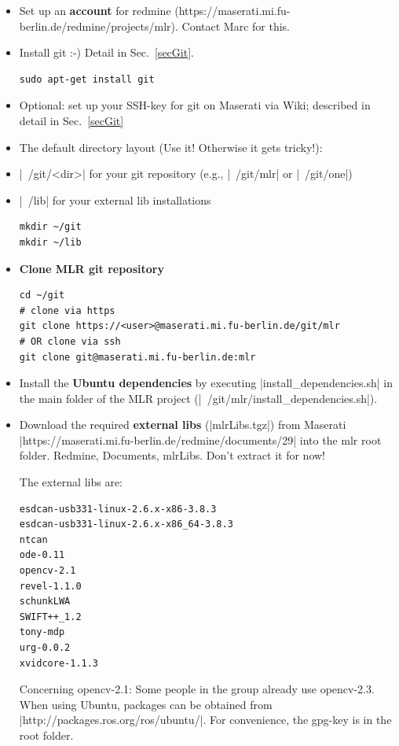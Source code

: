 \begin{itemize}
\item Set up an \textbf{account} for redmine
   (https://maserati.mi.fu-berlin.de/redmine/projects/mlr).
   Contact Marc for this.

\item Install git :-) Detail in Sec.~\ref{secGit}.
\begin{code}
\begin{verbatim}
sudo apt-get install git
\end{verbatim}
\end{code}

\item Optional: set up your SSH-key for git on Maserati via Wiki; described in
detail in Sec.~\ref{secGit}

\item The default directory layout (Use it! Otherwise it gets tricky!):
\bi
\item |~/git/<dir>| for your git repository (e.g., |~/git/mlr| or
|~/git/one|)
\item |~/lib| for your external lib installations
\ei
\begin{code}
\begin{verbatim}
mkdir ~/git
mkdir ~/lib
\end{verbatim}
\end{code}

\item \textbf{Clone MLR git repository}
\begin{code}
\begin{verbatim}
cd ~/git
# clone via https
git clone https://<user>@maserati.mi.fu-berlin.de/git/mlr
# OR clone via ssh
git clone git@maserati.mi.fu-berlin.de:mlr
\end{verbatim}
\end{code}

\item Install the \textbf{Ubuntu dependencies} by executing |install_dependencies.sh| in the main folder of the MLR project (|~/git/mlr/install_dependencies.sh|).

\item Download the required \textbf{external libs} (|mlrLibs.tgz|) from Maserati |https://maserati.mi.fu-berlin.de/redmine/documents/29| into the mlr root folder.
Redmine, Documents, mlrLibs.
Don't extract it for now!

The external libs are:
\begin{code}
\begin{verbatim}
esdcan-usb331-linux-2.6.x-x86-3.8.3
esdcan-usb331-linux-2.6.x-x86_64-3.8.3
ntcan
ode-0.11
opencv-2.1
revel-1.1.0
schunkLWA
SWIFT++_1.2
tony-mdp
urg-0.0.2
xvidcore-1.1.3
\end{verbatim}
\end{code}
Concerning opencv-2.1: Some people in the group already use opencv-2.3.
When using Ubuntu, packages can be obtained from
|http://packages.ros.org/ros/ubuntu/|. For convenience, the gpg-key
is in the root folder.


\end{itemize}
